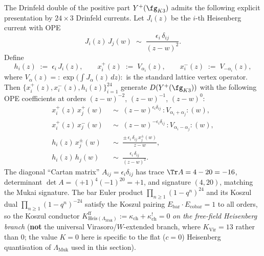 \begin{theorem}
\label{thm:cy-c-abelian-K3-currents}
The Drinfeld double of the positive part $Y^+(\fg_{K3})$ admits the
following explicit presentation by $24 \times 3$ Drinfeld currents. Let
$J_i(z)$ be the $i$-th Heisenberg current with OPE
\[
 J_i(z)\, J_j(w) \;\sim\; \frac{\epsilon_i\, \delta_{ij}}{(z - w)^2}.
\]
Define
\[
 h_i(z) \;:=\; \epsilon_i\, J_i(z),
 \qquad
 x^+_i(z) \;:=\; V_{\alpha_i}(z),
 \qquad
 x^-_i(z) \;:=\; V_{-\alpha_i}(z),
\]
where $V_{\alpha}(z) = {:}\exp\!\bigl(\int J_\alpha(z)\, dz\bigr){:}$ is the
standard lattice vertex operator. Then $\{x^+_i(z), x^-_i(z), h_i(z)\}_{i=1}^{24}$
generate $D(Y^+(\fg_{K3}))$ with the following OPE coefficients at orders
$(z-w)^{-2}$, $(z-w)^{-1}$, $(z-w)^0$:
\begin{align*}
 x^+_i(z)\, x^+_j(w) &\;\sim\; (z - w)^{\epsilon_i \delta_{ij}}\,
 {:}V_{\alpha_i + \alpha_j}{:}(w),
 \\
 x^+_i(z)\, x^-_j(w) &\;\sim\; (z - w)^{-\epsilon_i \delta_{ij}}\,
 {:}V_{\alpha_i - \alpha_j}{:}(w),
 \\
 h_i(z)\, x^\pm_j(w) &\;\sim\; \frac{\pm\, \epsilon_i\, \delta_{ij}\,
 x^\pm_j(w)}{z - w},
 \\
 h_i(z)\, h_j(w) &\;\sim\; \frac{\epsilon_i\, \delta_{ij}}{(z - w)^2}.
\end{align*}
The diagonal ``Cartan matrix'' $A_{ij} = \epsilon_i \delta_{ij}$ has trace
$\Tr A = 4 - 20 = -16$, determinant $\det A = (+1)^4 (-1)^{20} = +1$, and
signature $(4, 20)$, matching the Mukai signature. The bar Euler product
$\prod_{n \geq 1}(1 - q^n)^{24}$ and its Koszul dual $\prod_{n \geq 1}(1 - q^n)^{-24}$
satisfy the Koszul pairing $E_{\mathrm{bar}} \cdot E_{\mathrm{cobar}} = 1$ to all
orders, so the Koszul conductor $K^{\mathrm{ff}}_{\mathrm{Heis}(\Lambda_{\mathrm{Muk}})}
:= \kappa_{\mathrm{ch}} + \kappa_{\mathrm{ch}}^{!} = 0$ \emph{on the free-field
Heisenberg branch} (\textbf{not} the universal Virasoro/$W$-extended branch,
where $K_{\mathrm{Vir}} = 13$ rather than $0$; the value $K = 0$ here is specific to the
flat ($c = 0$) Heisenberg quantisation of $\Lambda_{\mathrm{Muk}}$ used in this section).
\end{theorem}


